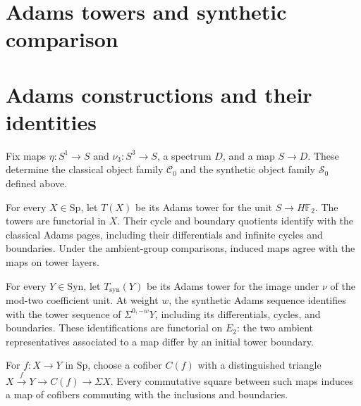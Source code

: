 \section{Adams towers and synthetic comparison}
\section{Adams constructions and their identities}

\begin{definition}
\label{frontier:AdamsSynthetic:0895d4999173}
Fix maps $\eta\colon S^1\to S$ and $\nu_3\colon S^3\to S$, a spectrum $D$, and a map $S\to D$. These determine the classical object family $\mathcal C_0$ and the synthetic object family $\mathcal S_0$ defined above.
\end{definition}

\begin{definition}
\label{frontier:AdamsSynthetic:14d5e6606bc5}
For every $X\in\mathrm{Sp}$, let $T(X)$ be its Adams tower for the unit $S\to H\mathbb F_2$. The towers are functorial in $X$. Their cycle and boundary quotients identify with the classical Adams pages, including their differentials and infinite cycles and boundaries. Under the ambient-group comparisons, induced maps agree with the maps on tower layers.
\end{definition}

\begin{definition}
\label{frontier:AdamsSynthetic:1b85f123880c}
For every $Y\in\mathrm{Syn}$, let $T_{\mathrm{syn}}(Y)$ be its Adams tower for the image under $\nu$ of the mod-two coefficient unit. At weight $w$, the synthetic Adams sequence identifies with the tower sequence of $\Sigma^{0,-w}Y$, including its differentials, cycles, and boundaries. These identifications are functorial on $E_2$: the two ambient representatives associated to a map differ by an initial tower boundary.
\end{definition}

\begin{definition}
\label{frontier:AdamsSynthetic:23334467e67d}
For $f\colon X\to Y$ in $\mathrm{Sp}$, choose a cofiber $C(f)$ with a distinguished triangle $X\xrightarrow f Y\to C(f)\to\Sigma X$. Every commutative square between such maps induces a map of cofibers commuting with the inclusions and boundaries.
\end{definition}

